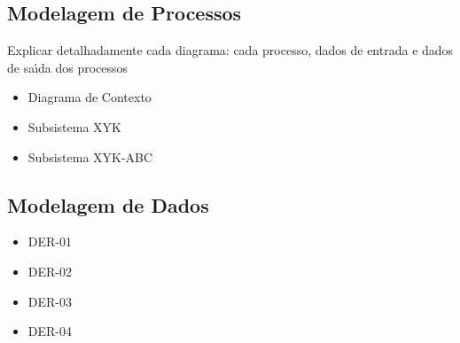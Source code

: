 \subsection{Modelagem de Processos}

Explicar detalhadamente cada diagrama: cada processo, dados de entrada e dados de sa\'{\i}da dos processos

\begin{itemize}
  \item Diagrama de Contexto

  \item Subsistema XYK

  \item Subsistema XYK-ABC

\end{itemize}



\subsection{Modelagem de Dados}

\begin{itemize}
  \item DER-01

  \item DER-02

  \item DER-03

  \item DER-04

\end{itemize}

